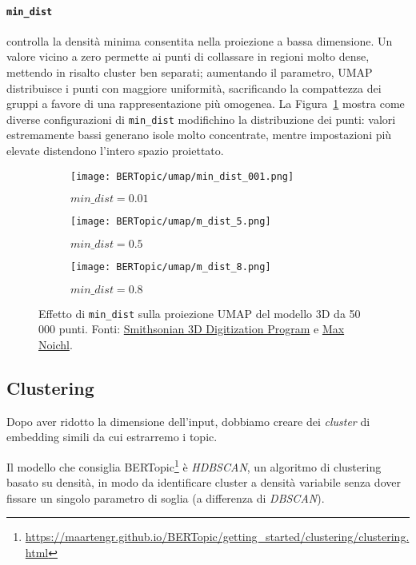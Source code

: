 \paragraph{\texttt{min\_dist}} controlla la densità minima consentita nella proiezione a bassa dimensione. Un valore vicino a zero permette ai punti di collassare in regioni molto dense, mettendo in risalto cluster ben separati; aumentando il parametro, UMAP distribuisce i punti con maggiore uniformità, sacrificando la compattezza dei gruppi a favore di una rappresentazione più omogenea. La Figura~\ref{fig:umap-min-dist} mostra come diverse configurazioni di \texttt{min\_dist} modifichino la distribuzione dei punti: valori estremamente bassi generano isole molto concentrate, mentre impostazioni più elevate distendono l'intero spazio proiettato.
\begin{figure}[H]
\centering

\begin{subfigure}{0.32\textwidth}
    \centering
    \texttt{[image: BERTopic/umap/min\_dist\_001.png]}
    \caption{$min\_dist = 0.01$}
\end{subfigure}\hfill
\begin{subfigure}{0.32\textwidth}
    \centering
    \texttt{[image: BERTopic/umap/m\_dist\_5.png]}
    \caption{$min\_dist = 0.5$}
\end{subfigure}\hfill
\begin{subfigure}{0.32\textwidth}
    \centering
    \texttt{[image: BERTopic/umap/m\_dist\_8.png]}
    \caption{$min\_dist = 0.8$}
\end{subfigure}
\caption{Effetto di \texttt{min\_dist} sulla proiezione UMAP del modello 3D da 50\,000 punti. Fonti: \href{https://3d.si.edu/object/3d/mammuthus-primigenius-blumbach:341c96cd-f967-4540-8ed1-d3fc56d31f12}{Smithsonian 3D Digitization Program} e \href{https://www.maxnoichl.eu/projects/mammoth/}{Max Noichl}.}
\label{fig:umap-min-dist}
\end{figure}
\subsection{Clustering}
\noindent Dopo aver ridotto la dimensione dell'input, dobbiamo creare dei \textit{cluster} di embedding simili da cui estrarremo i topic.

\noindent Il modello che consiglia BERTopic\footnote{\url{https://maartengr.github.io/BERTopic/getting_started/clustering/clustering.html}} è \textit{HDBSCAN}, un algoritmo di clustering basato su densità, in modo da identificare cluster a densità variabile senza dover fissare un singolo parametro di soglia (a differenza di \textit{DBSCAN}).

